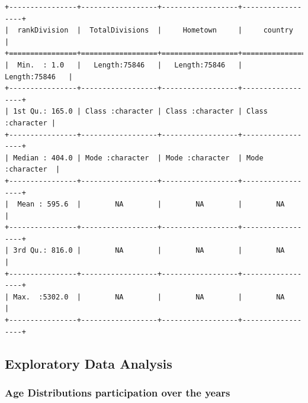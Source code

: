 \documentclass[
]{article}
\begin{document}
\begin{verbatim}
+----------------+------------------+------------------+------------------+
|  rankDivision  |  TotalDivisions  |     Hometown     |     country      |
+================+==================+==================+==================+
|  Min.  : 1.0   |   Length:75846   |   Length:75846   |   Length:75846   |
+----------------+------------------+------------------+------------------+
| 1st Qu.: 165.0 | Class :character | Class :character | Class :character |
+----------------+------------------+------------------+------------------+
| Median : 404.0 | Mode :character  | Mode :character  | Mode :character  |
+----------------+------------------+------------------+------------------+
|  Mean : 595.6  |        NA        |        NA        |        NA        |
+----------------+------------------+------------------+------------------+
| 3rd Qu.: 816.0 |        NA        |        NA        |        NA        |
+----------------+------------------+------------------+------------------+
| Max.  :5302.0  |        NA        |        NA        |        NA        |
+----------------+------------------+------------------+------------------+
\end{verbatim}

\newpage

\hypertarget{exploratory-data-analysis}{%
\subsection{Exploratory Data Analysis}\label{exploratory-data-analysis}}

\hypertarget{age-distributions-participation-over-the-years}{%
\subsubsection{Age Distributions participation over the
years}\label{age-distributions-participation-over-the-years}}
\end{document}
